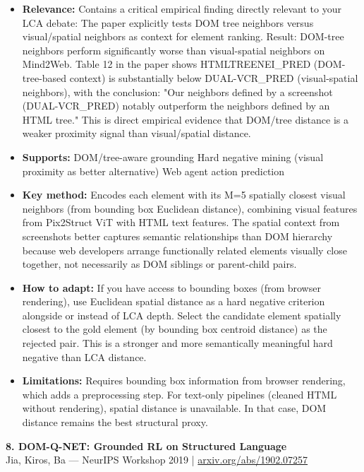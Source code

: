 \documentclass[pdflatex,sn-mathphys-num]{sn-jnl}
\theoremstyle{thmstyleone}
\theoremstyle{thmstyletwo}
\theoremstyle{thmstylethree}
\begin{document}
\begin{itemize}
    \item \textbf{Relevance:} Contains a critical empirical finding directly relevant to your LCA debate: The paper explicitly tests DOM tree neighbors versus visual/spatial neighbors as context for element ranking. Result: DOM-tree neighbors perform significantly worse than visual-spatial neighbors on Mind2Web. Table 12 in the paper shows HTMLTREENEI\_PRED (DOM-tree-based context) is substantially below DUAL-VCR\_PRED (visual-spatial neighbors), with the conclusion: "Our neighbors defined by a screenshot (DUAL-VCR\_PRED) notably outperform the neighbors defined by an HTML tree." This is direct empirical evidence that DOM/tree distance is a weaker proximity signal than visual/spatial distance.
    \item \textbf{Supports:} \checkmark DOM/tree-aware grounding \checkmark Hard negative mining (visual proximity as better alternative) \checkmark Web agent action prediction
    \item \textbf{Key method:} Encodes each element with its M=5 spatially closest visual neighbors (from bounding box Euclidean distance), combining visual features from Pix2Struct ViT with HTML text features. The spatial context from screenshots better captures semantic relationships than DOM hierarchy because web developers arrange functionally related elements visually close together, not necessarily as DOM siblings or parent-child pairs.
    \item \textbf{How to adapt:} If you have access to bounding boxes (from browser rendering), use Euclidean spatial distance as a hard negative criterion alongside or instead of LCA depth. Select the candidate element spatially closest to the gold element (by bounding box centroid distance) as the rejected pair. This is a stronger and more semantically meaningful hard negative than LCA distance.
    \item \textbf{Limitations:} Requires bounding box information from browser rendering, which adds a preprocessing step. For text-only pipelines (cleaned HTML without rendering), spatial distance is unavailable. In that case, DOM distance remains the best structural proxy.
\end{itemize}

\textbf{8. DOM-Q-NET: Grounded RL on Structured Language} \\
Jia, Kiros, Ba --- NeurIPS Workshop 2019 | \href{https://arxiv.org/abs/1902.07257}{arxiv.org/abs/1902.07257}
\end{document}
